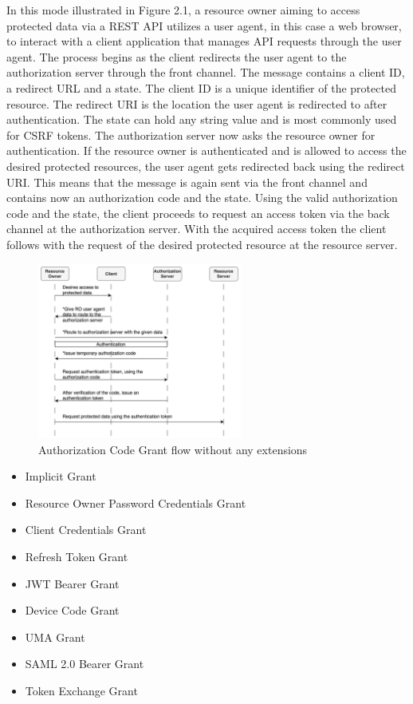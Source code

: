 \documentclass[
    fontsize=12pt,
    headings=small,
    parskip=half,           %
    bibliography=totoc,
    numbers=noenddot,       %
    open=any,               %
    ]{scrreprt}
\begin{document}
In this mode illustrated in Figure 2.1, a resource owner aiming to access protected data via a REST API utilizes a user agent, in this case a web browser, to interact with a client application that manages API requests through the user agent.
The process begins as the client redirects the user agent to the authorization server through the front channel. The message contains a client ID, a redirect URL and a state. The client ID is a unique identifier of the protected resource. The redirect URI is the location the user agent is redirected to after authentication. The state can hold any string value and is most commonly used for CSRF tokens. 
The authorization server now asks the resource owner for authentication. If the resource owner is authenticated and is allowed to access the desired protected resources, the user agent gets redirected back using the redirect URI. This means that the message is again sent via the front channel and contains now an authorization code and the state. 
Using the valid authorization code and the state, the client proceeds to request an access token via the back channel at the authorization server. 
With the acquired access token the client follows with the request of the desired protected resource at the resource server.

\begin{figure}[ht]
	\sffamily\footnotesize
	\includegraphics[width=0.6\textwidth]{pic/authorization_code_grant.png}
	\unitlength=0.75mm
	\linethickness{0.4pt}
	\caption{Authorization Code Grant flow without any extensions}
	\label{fig:auth_code_grant}
\end{figure}
	
\begin{itemize}
	\item Implicit Grant
	\item Resource Owner Password Credentials Grant
	\item Client Credentials Grant
	\item Refresh Token Grant
	\item JWT Bearer Grant
	\item Device Code Grant
	\item UMA Grant
	\item SAML 2.0 Bearer Grant
	\item Token Exchange Grant
\end{itemize}
\end{document}
